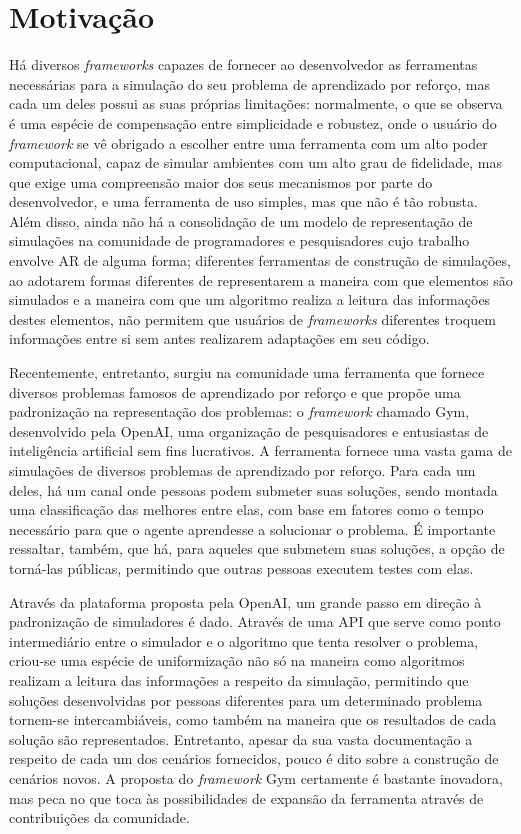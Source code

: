 \documentclass[cic,tc]{iiufrgs}
\begin{document}
\section{Motivação}
Há diversos \textit{frameworks} capazes de fornecer ao desenvolvedor as ferramentas necessárias para a simulação do seu problema de aprendizado por reforço,
mas cada um deles possui as suas próprias limitações: normalmente, o que se observa é uma espécie de compensação entre simplicidade e robustez, onde o
usuário do \textit{framework} se vê obrigado a escolher entre uma ferramenta com um alto poder computacional, capaz de simular ambientes com um alto
grau de fidelidade, mas que exige uma compreensão maior dos seus mecanismos por parte do desenvolvedor, e uma ferramenta de uso simples, mas que
não é tão robusta. Além disso, ainda não há a consolidação de um modelo de representação de simulações na comunidade de programadores e pesquisadores
cujo trabalho envolve AR de alguma forma; diferentes ferramentas de construção de simulações, ao adotarem formas diferentes de representarem a maneira
com que elementos são simulados e a maneira com que um algoritmo realiza a leitura das informações destes elementos, não permitem que usuários de
\textit{frameworks} diferentes troquem informações entre si sem antes realizarem adaptações em seu código.


Recentemente, entretanto, surgiu na comunidade uma ferramenta que fornece diversos problemas famosos de aprendizado por reforço e que propõe uma
padronização na representação dos problemas: o \textit{framework} chamado Gym, desenvolvido pela OpenAI, uma organização de pesquisadores e entusiastas
de inteligência artificial sem fins lucrativos. A ferramenta fornece uma vasta gama de simulações de diversos problemas de aprendizado por reforço. Para
cada um deles, há um canal onde pessoas podem submeter suas soluções, sendo montada uma classificação das melhores entre elas, com base em fatores como
o tempo necessário para que o agente aprendesse a solucionar o problema. É importante ressaltar, também, que há, para aqueles que submetem suas soluções,
a opção de torná-las públicas, permitindo que outras pessoas executem testes com elas.


Através da plataforma proposta pela OpenAI, um grande passo em direção à padronização de simuladores é dado. Através de uma API que serve como ponto
intermediário entre o simulador e o algoritmo que tenta resolver o problema, criou-se uma espécie de uniformização não só na maneira como algoritmos
realizam a leitura das informações a respeito da simulação, permitindo que soluções desenvolvidas por pessoas diferentes para um determinado problema
tornem-se intercambiáveis, como também na maneira que os resultados de cada solução são representados. Entretanto, apesar da sua vasta documentação
a respeito de cada um dos cenários fornecidos, pouco é dito sobre a construção de cenários novos. A proposta do \textit{framework} Gym certamente é
bastante inovadora, mas peca no que toca às possibilidades de expansão da ferramenta através de contribuições da comunidade.
\end{document}
